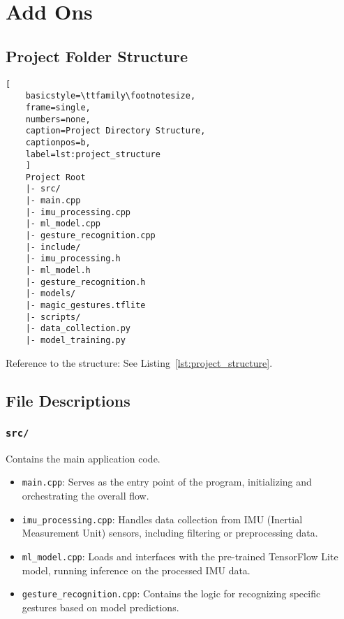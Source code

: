 %
%

\chapter{Add Ons}

\section{Project Folder Structure}

\begin{lstlisting}[
	basicstyle=\ttfamily\footnotesize, 
	frame=single, 
	numbers=none, 
	caption=Project Directory Structure, 
	captionpos=b, 
	label=lst:project_structure
	]
	Project Root
	|- src/
	|- main.cpp
	|- imu_processing.cpp
	|- ml_model.cpp
	|- gesture_recognition.cpp
	|- include/
	|- imu_processing.h
	|- ml_model.h
	|- gesture_recognition.h
	|- models/
	|- magic_gestures.tflite
	|- scripts/
	|- data_collection.py
	|- model_training.py 
\end{lstlisting}

Reference to the structure: See Listing~\ref{lst:project_structure}.


\section{File Descriptions}


\subsection*{\texttt{src/}}
Contains the main application code.

\begin{itemize}
	\item \texttt{main.cpp}: Serves as the entry point of the program, initializing and orchestrating the overall flow.
	\item \texttt{imu\_processing.cpp}: Handles data collection from IMU (Inertial Measurement Unit) sensors, including filtering or preprocessing data.
	\item \texttt{ml\_model.cpp}: Loads and interfaces with the pre-trained TensorFlow Lite model, running inference on the processed IMU data.
	\item \texttt{gesture\_recognition.cpp}: Contains the logic for recognizing specific gestures based on model predictions.
\end{itemize}

